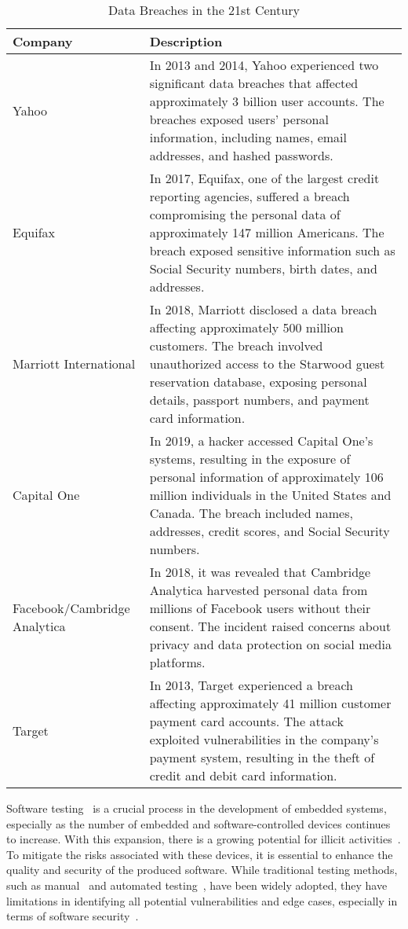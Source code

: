 \begin{table}[ht]
\caption{Data Breaches in the 21st Century}
\label{tab:data_breaches}
\begin{tabularx}{\textwidth}{|l|X|}
\hline
\textbf{Company} & \textbf{Description} \\
\hline
Yahoo & In 2013 and 2014, Yahoo experienced two significant data breaches that affected approximately 3 billion user accounts. The breaches exposed users' personal information, including names, email addresses, and hashed passwords. \\
\hline
Equifax & In 2017, Equifax, one of the largest credit reporting agencies, suffered a breach compromising the personal data of approximately 147 million Americans. The breach exposed sensitive information such as Social Security numbers, birth dates, and addresses. \\
\hline
Marriott International & In 2018, Marriott disclosed a data breach affecting approximately 500 million customers. The breach involved unauthorized access to the Starwood guest reservation database, exposing personal details, passport numbers, and payment card information. \\
\hline
Capital One & In 2019, a hacker accessed Capital One's systems, resulting in the exposure of personal information of approximately 106 million individuals in the United States and Canada. The breach included names, addresses, credit scores, and Social Security numbers. \\
\hline
Facebook/Cambridge Analytica & In 2018, it was revealed that Cambridge Analytica harvested personal data from millions of Facebook users without their consent. The incident raised concerns about privacy and data protection on social media platforms. \\
\hline
Target & In 2013, Target experienced a breach affecting approximately 41 million customer payment card accounts. The attack exploited vulnerabilities in the company's payment system, resulting in the theft of credit and debit card information. \\
\hline
\end{tabularx}
\end{table}


Software testing~\cite{myers2011art} is a crucial process in the development of embedded systems,
especially as the number of embedded and software-controlled devices continues
to increase. With this expansion, there is a growing potential for
illicit activities~\cite{broekman2003testing}. To mitigate the risks associated with these devices,
it is essential to enhance the quality and security of the produced software.
While traditional testing methods, such as manual~\cite{itkonen2009testers} and automated testing~\cite{asfaw2015benefits},
have been widely adopted, they have limitations in identifying all potential
vulnerabilities and edge cases, especially in terms of software security~\cite{819971}.

